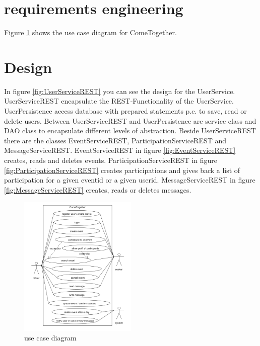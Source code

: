 \section{requirements engineering}\label{requirementsengineering}
Figure \ref{fig:useCaseDiagram} shows the use case diagram for ComeTogether.

\section{Design}\label{Design}

In figure \ref{fig:UserServiceREST} you can see the design for the UserService. UserServiceREST encapsulate the REST-Functionality of the UserService. UserPersistence access database with prepared statements p.e. to save, read or delete users. Between UserServiceREST and UserPersistence are service class and DAO class to encapsulate different levels of abstraction. Beside UserServiceREST there are the classes EventServiceREST, ParticipationServiceREST and MessageServiceREST. EventServiceREST in figure \ref{fig:EventServiceREST} creates, reads and deletes events. ParticipationServiceREST in figure \ref{fig:ParticipationServiceREST} creates participations and gives back a list of participation for a given eventid or a given userid. MessageServiceREST in figure \ref{fig:MessageServiceREST} creates, reads or deletes messages.

\begin{figure}[htp]
\centering
\includegraphics[width=0.5\textwidth]{Ingo/pictures/UseCaseDiagram.png}
\caption{use case diagram}
\label{fig:useCaseDiagram}
\end{figure}


